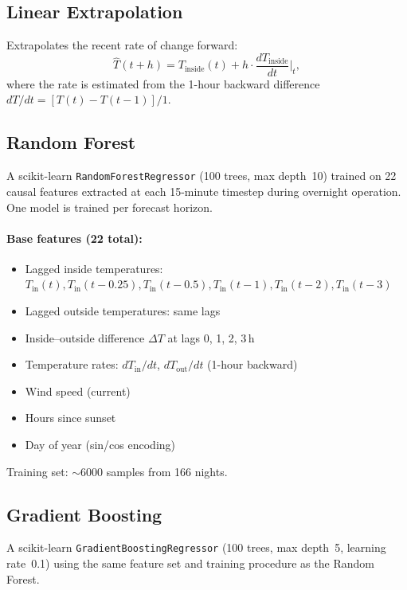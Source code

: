 \documentclass[11pt]{article}
\begin{document}
\subsection{Linear Extrapolation}

Extrapolates the recent rate of change forward:
\begin{equation}
  \hat{T}(t+h) = T_\mathrm{inside}(t) + h \cdot \frac{dT_\mathrm{inside}}{dt}\bigg|_t ,
\end{equation}
where the rate is estimated from the 1-hour backward difference
$dT/dt = [T(t) - T(t-1)]/1$.

\subsection{Random Forest}

A scikit-learn \texttt{RandomForestRegressor} (100 trees, max depth~10) trained
on 22 causal features extracted at each 15-minute timestep during overnight
operation.  One model is trained per forecast horizon.

\paragraph{Base features (22 total):}
\begin{itemize}
  \item Lagged inside temperatures: $T_\mathrm{in}(t), T_\mathrm{in}(t{-}0.25), T_\mathrm{in}(t{-}0.5), T_\mathrm{in}(t{-}1), T_\mathrm{in}(t{-}2), T_\mathrm{in}(t{-}3)$
  \item Lagged outside temperatures: same lags
  \item Inside--outside difference $\Delta T$ at lags 0, 1, 2, 3\,h
  \item Temperature rates: $dT_\mathrm{in}/dt$, $dT_\mathrm{out}/dt$ (1-hour backward)
  \item Wind speed (current)
  \item Hours since sunset
  \item Day of year (sin/cos encoding)
\end{itemize}

Training set: $\sim$6000 samples from 166 nights.

\subsection{Gradient Boosting}

A scikit-learn \texttt{GradientBoostingRegressor} (100 trees, max depth~5,
learning rate~0.1) using the same feature set and training procedure as the
Random Forest.
\end{document}
